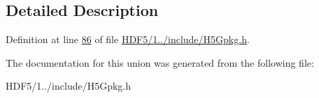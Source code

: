 \subsection{Detailed Description}


Definition at line \hyperlink{_h_d_f5_21_810_81_2include_2_h5_gpkg_8h_source_l00086}{86} of file \hyperlink{_h_d_f5_21_810_81_2include_2_h5_gpkg_8h_source}{H\+D\+F5/1../include/\+H5\+Gpkg.\+h}.



The documentation for this union was generated from the following file\+:\begin{DoxyCompactItemize}
\item 
H\+D\+F5/1../include/\+H5\+Gpkg.\+h\end{DoxyCompactItemize}
